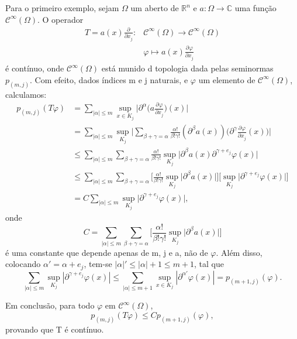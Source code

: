 \documentclass[../distribution_theory_notes.tex]{subfiles}
\begin{document}
  \begin{example}
    Para o primeiro exemplo, sejam \(\Omega \) um aberto de \(\mathbb{R}^{n}\) e \(a:\Omega \rightarrow \mathbb{C}\) uma função \(\mathcal{C}^{\infty}(\Omega )\). O operador 
   \begin{align*}
     T=a(x)\frac{\partial^{}}{\partial x_{j}^{}}:&\mathcal{C}^{\infty}(\Omega )\rightarrow \mathcal{C}^{\infty}(\Omega )\\ 
                                                 &\varphi \mapsto a(x)\frac{\partial^{}\varphi }{\partial x_{j}^{}}
   \end{align*}
   é contínuo, onde \(\mathcal{C}^{\infty}(\Omega )\) está munido d topologia dada pelas seminormas \(p_{(m, j)}.\) Com efeito, dados índices m e j naturais, e \(\varphi \) um elemento de \(\mathcal{C}^{\infty}(\Omega )\), calculamos: 
  \begin{align*}
    p_{(m, j)}(T\varphi )&=\sum\limits_{|\alpha |\leq m}^{}\sup_{x\in K_{j}} \biggl\vert \partial^{\alpha }\biggl(a \frac{\partial^{}\varphi }{\partial x_{j}^{}}\biggr)(x) \biggr\vert\\
                         &=\sum\limits_{|\alpha |\leq m}^{}\sup_{K_{j}}\bigl\vert \sum\limits_{\beta+\gamma =\alpha }^{} \frac{\alpha!}{\beta!\gamma!}(\partial^{\beta }a(x))\biggl(\partial^{\gamma }\frac{\partial^{}\varphi }{\partial x_{j}^{}}(x)\biggr)\bigr\vert\\ 
                         &\leq \sum\limits_{|\alpha |\leq m}^{}\sum\limits_{\beta +\gamma =\alpha }^{}\frac{\alpha!}{\beta!\gamma!}\sup_{K_{j}}\biggl\vert \partial^{\beta }a(x)\partial^{\gamma +e_{j}}\varphi(x) \biggr\vert\\ 
                         &\leq \sum\limits_{|\alpha |\leq m}^{}\sum\limits_{\beta +\gamma =\alpha }^{}\biggl[\frac{\alpha!}{\beta!\gamma!}\sup_{K_{j}}\bigl\vert \partial^{\beta }a(x)\bigr\vert\biggr]\biggl[\sup_{K_{j}}\bigr\vert\partial^{\gamma +e_{j}}\varphi(x) \bigr\vert\biggr]\\ 
                         &= C \sum\limits_{|\alpha |\leq m}^{} \sup_{K_{j}}\biggl\vert \partial^{\gamma +e_{j}}\varphi (x) \biggr\vert,
  \end{align*}
  onde 
    \[
      C=\sum\limits_{|\alpha |\leq m}^{}\sum\limits_{\beta +\gamma =\alpha }^{}\biggl[\frac{\alpha!}{\beta!\gamma!}\sup_{K_{j}}\bigl\vert \partial^{\beta }a(x)\bigr\vert\biggr]
    \] 
    é uma constante que depende apenas de m, j e a, não de \(\varphi \). Além disso, colocando \(\alpha '= \alpha +e_{j}\), tem-se \(|\alpha |'\leq |\alpha |+1 \leq m+1\), tal que
      \[
        \sum\limits_{|\alpha |\leq m}^{}\sup_{K_{j}}|\partial^{\gamma +e_{j}}\varphi (x)|\leq \sum\limits_{|\alpha |\leq m+1}^{}\sup_{x\in K_{j}}|\partial^{\alpha '}\varphi (x)|=p_{(m+1, j)}(\varphi ).
      \]

      Em conclusão, para todo \(\varphi \) em \(\mathcal{C}^{\infty}(\Omega )\), 
        \[
          p_{(m, j)}(T\varphi )\leq Cp_{(m+1, j)}(\varphi ),
        \]
        provando que T é contínuo.
  \end{example}
\end{document}
